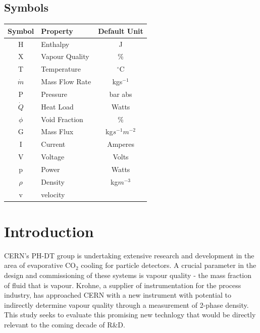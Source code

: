 \documentclass{report}
\begin{document}
\section*{Symbols}
\begin{tabular}{|c|l|c|}
\hline
\textbf{Symbol} & \textbf{Property} & \textbf{Default Unit} \\\hline
H & Enthalpy & J \\\hline
X & Vapour Quality & \% \\\hline
T & Temperature & $^\circ$C\\\hline
$\dot{m}$ & Mass Flow Rate & kgs$^{-1}$ \\\hline
P & Pressure & bar abs \\\hline
$\dot{Q}$ & Heat Load & Watts \\\hline
$\phi$ & Void Fraction & \% \\\hline
G & Mass Flux & kg$s^{-1}m^{-2}$\\\hline
I & Current & Amperes \\\hline
V & Voltage & Volts \\\hline
p & Power & Watts \\\hline
$\rho$ & Density & kg$m^{-3}$\\\hline
v & velocity & 
\end{tabular}
\tableofcontents
\chapter{Introduction}
\doublespacing
CERN's PH-DT group is undertaking extensive research and development in the area of evaporative CO$_2$ cooling for particle detectors. A crucial parameter in the design and commissioning of these systems is vapour quality - the mass fraction of fluid that is vapour. Krohne, a supplier of instrumentation for the process industry, has approached CERN with a new instrument with potential to indirectly determine vapour quality through a measurement of 2-phase density. This study seeks to evaluate this promising new technlogy that would be directly relevant to the coming decade of R\&\ignorespaces D. 
\end{document}
